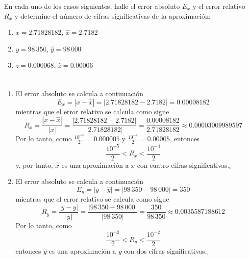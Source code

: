 \begin{enunciado}
 En cada uno de los casos siguientes, halle el error absoluto $E_x$ y el error relativo $R_x$ y determine el n\'umero de cifras significativas de la aproximaci\'on:
 \begin{enumerate}
  \item $x = 2.71828182$, $\widehat{x} = 2.7182$
  \item $y = 98\,350$, $\widehat{y} = 98\,000$
  \item $z = 0.000068$, $\widehat{z} = 0.00006$
 \end{enumerate}
\end{enunciado}

\begin{solucion}
 $\phantom{0}$
 \begin{enumerate}
  \item El error absoluto se calcula a continuaci\'on
  \begin{equation*}
   E_x = \left| x - \widehat{x} \right| = \left| 2.71828182 - 2.7182 \right| = 0.00008182
  \end{equation*}
  mientras que el error relativo se calcula como sigue
  \begin{equation*}
   R_x = \frac{\left| x - \widehat{x} \right|}{|x|} = \frac{\left| 2.71828182 - 2.7182 \right|}{|2.71828182|} = \frac{0.00008182}{2.71828182} \approx 0.00003009989597
  \end{equation*}
  Por lo tanto, como $\frac{10^{-5}}{2} = 0.000005$ y $\frac{10^{-4}}{2} = 0.00005$, entonces
  \begin{equation*}
   \frac{10^{-5}}{2} < R_x < \frac{10^{-4}}{2}
  \end{equation*}
  y, por tanto, $\widehat{x}$ es una aproximaci\'on a $x$ con cuatro cifras significativas.${}_{\square}$
  
  \item El error absoluto se calcula a continuaci\'on
  \begin{equation*}
   E_y = \left| y - \widehat{y} \right| = \left| 98\,350 - 98\,000 \right| = 350
  \end{equation*}
  mientras que el error relativo se calcula como sigue
  \begin{equation*}
   R_y = \frac{\left| y - \widehat{y} \right|}{|y|} = \frac{\left| 98\,350 - 98\,000 \right|}{|98\,350|} = \frac{350}{98\,350} \approx 0.0035587188612
  \end{equation*}
  Por lo tanto, como
  \begin{equation*}
   \frac{10^{-3}}{2} < R_y < \frac{10^{-2}}{2}
  \end{equation*}
  entonces $\widehat{y}$ es una aproximaci\'on a $y$ con dos cifras significativas.${}_{\square}$
  

\end{enumerate}
\end{solucion}

